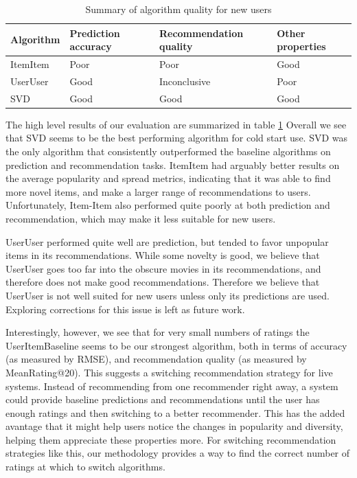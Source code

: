 \documentclass[letterpaper]{sig-alternate}
\begin{document}
  \begin{table}[ht!]
    \centering
    \begin{tabular}{|p{4.5em}|p{4.5em}|p{7.5em}|p{4.5em}|}
      \hline
      Algorithm & Prediction accuracy & Recommendation quality      & Other properties \\\hline
      ItemItem  & Poor                & Poor                        & Good             \\\hline
      UserUser  & Good                & Inconclusive                & Poor             \\\hline
      SVD       & Good                & Good                        & Good             \\\hline
    \end{tabular}
    \caption{Summary of algorithm quality for new users}
    \label{tbl:results}
  \end{table}

  The high level results of our evaluation are summarized in table \ref{tbl:results}
  Overall we see that SVD seems to be the best performing algorithm for cold start use.
  SVD was the only algorithm that consistently outperformed the baseline algorithms on prediction and recommendation tasks.
  ItemItem had arguably better results on the average popularity and spread metrics, indicating that it was able to find more novel items, and make a larger range of recommendations to users.
  Unfortunately, Item-Item also performed quite poorly at both prediction and recommendation, which may make it less suitable for new users.

  UserUser performed quite well are prediction, but tended to favor unpopular items in its recommendations.
  While some novelty is good, we believe that UserUser goes too far into the obscure movies in its recommendations, and therefore does not make good recommendations.
  Therefore we believe that UserUser is not well suited for new users unless only its predictions are used.
  Exploring corrections for this issue is left as future work.


  Interestingly, however, we see that for very small numbers of ratings the UserItemBaseline seems to be our strongest algorithm, both in terms of accuracy (as measured by RMSE), and recommendation quality (as measured by MeanRating@20).
  This suggests a switching recommendation strategy for live systems.
  Instead of recommending from one recommender right away, a system could provide baseline predictions and recommendations until the user has enough ratings and then switching to a better recommender.
  This has the added avantage that it might help users notice the changes in popularity and diversity, helping them appreciate these properties more.
  For switching recommendation strategies like this, our methodology provides a way to find the correct number of ratings at which to switch algorithms.
\end{document}
